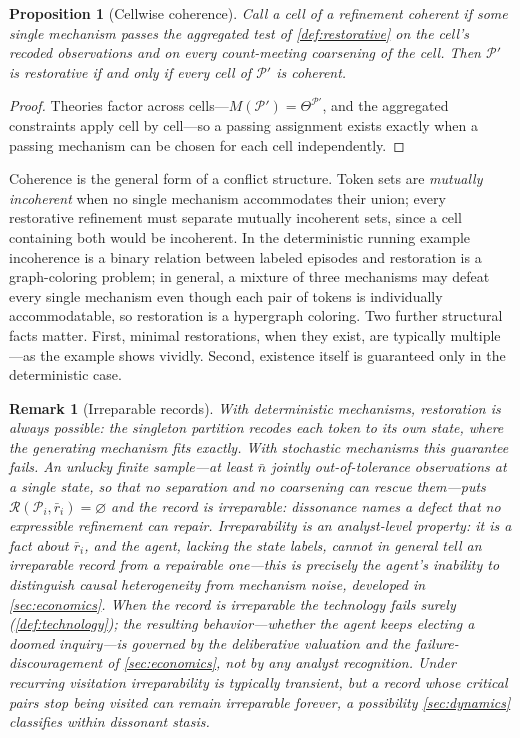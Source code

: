 \documentclass[11pt]{article}
\newtheorem{proposition}[assumption]{Proposition}
\newtheorem{remark}[assumption]{Remark}
\theoremstyle{definition}
\newcommand{\emptysetset}{\varnothing}
\begin{document}
\begin{proposition}[Cellwise coherence]
\label{prop:coherence}
Call a cell of a refinement \emph{coherent} if some single mechanism passes
the aggregated test of \cref{def:restorative} on the cell's recoded
observations and on every count-meeting coarsening of the cell.  Then
$\mathcal P'$ is restorative if and only if every cell of $\mathcal P'$ is
coherent.
\end{proposition}

\begin{proof}
Theories factor across cells---$M(\mathcal P')=\Theta^{\mathcal P'}$, and the
aggregated constraints apply cell by cell---so a passing assignment exists
exactly when a passing mechanism can be chosen for each cell independently.
\end{proof}

Coherence is the general form of a conflict structure.  Token sets are
\emph{mutually incoherent} when no single mechanism accommodates their
union; every restorative refinement must separate mutually incoherent sets,
since a cell containing both would be incoherent.  In the deterministic
running example incoherence is a binary relation between labeled episodes and
restoration is a graph-coloring problem; in general, a mixture of three
mechanisms may defeat every single mechanism even though each pair of tokens
is individually accommodatable, so restoration is a hypergraph coloring.
Two further structural facts matter.  First, minimal restorations, when they
exist, are typically multiple---as the example shows vividly.  Second,
existence itself is guaranteed only in the deterministic case.

\begin{remark}[Irreparable records]
\label{rem:irreparable}
With deterministic mechanisms, restoration is always possible: the singleton
partition recodes each token to its own state, where the generating mechanism
fits exactly.  With stochastic mechanisms this guarantee fails.  An unlucky
finite sample---at least $\bar n$ jointly out-of-tolerance observations at a
single state, so that no separation and no coarsening can rescue them---puts
$\mathcal R(\mathcal P_i,\bar r_i)=\emptysetset$ and the record is
\emph{irreparable}: dissonance names a defect that no expressible refinement
can repair.  Irreparability is an analyst-level property: it is a fact about
$\bar r_i$, and the agent, lacking the state labels, cannot in general tell an
irreparable record from a repairable one---this is precisely the agent's
inability to distinguish causal heterogeneity from mechanism noise, developed
in \cref{sec:economics}.  When the record is irreparable the technology fails
surely (\cref{def:technology}); the resulting behavior---whether the agent
keeps electing a doomed inquiry---is governed by the deliberative valuation
and the failure-discouragement of \cref{sec:economics}, not by any analyst
recognition.  Under recurring visitation irreparability is typically
transient, but a record whose critical pairs stop being visited can remain
irreparable forever, a possibility \cref{sec:dynamics} classifies within
dissonant stasis.
\end{remark}
\end{document}
